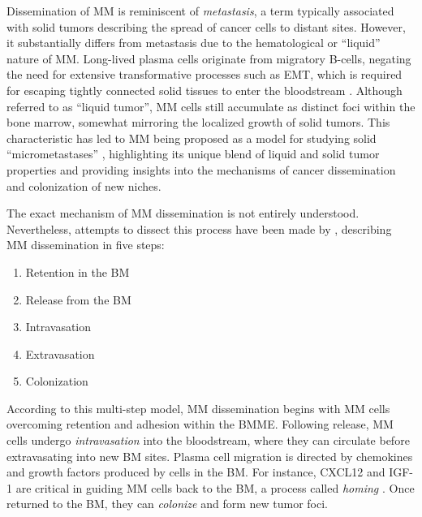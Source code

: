 Dissemination of \ac{MM} is reminiscent of \emph{metastasis}, a term typically
associated with solid tumors describing the spread of cancer cells to distant
sites. However, it substantially differs from metastasis due to the
hematological or ``liquid'' nature of \ac{MM}. Long-lived plasma cells originate
from migratory B-cells, negating the need for extensive transformative processes
such as \ac{EMT}, which is required for escaping tightly connected solid tissues
to enter the bloodstream
\cite{ribattiEpithelialMesenchymalTransitionCancer2020}. Although referred to as
``liquid tumor'', \ac{MM} cells still accumulate as distinct foci within the
bone marrow, somewhat mirroring the localized growth of solid tumors. This
characteristic has led to \ac{MM} being proposed as a model for studying solid
``micrometastases'' \cite{ghobrialMyelomaModelProcess2012}, highlighting its
unique blend of liquid and solid tumor properties and providing insights into
the mechanisms of cancer dissemination and colonization of new niches.

The exact mechanism of \ac{MM} dissemination is not entirely understood.
Nevertheless, attempts to dissect this process have been made by
\citet{zeissigTumourDisseminationMultiple2020}, describing \ac{MM} dissemination
in five steps:
\begin{enumerate}
    \item Retention in the \ac{BM}
    \item Release from the \ac{BM}
    \item Intravasation
    \item Extravasation
    \item Colonization
\end{enumerate}


According to this multi-step model, \ac{MM} dissemination begins with \ac{MM}
cells overcoming retention and adhesion within the \ac{BMME}. Following release,
\ac{MM} cells undergo \emph{intravasation} into the bloodstream, where they can
circulate before extravasating into new \ac{BM} sites. Plasma cell migration is
directed by chemokines and growth factors produced by cells in the \ac{BM}. For
instance, \ac{CXCL12} and \ac{IGF-1} are critical in guiding \ac{MM} cells back
to the \ac{BM}, a process called \emph{homing}
\cite{vandebroekExtravasationHomingMechanisms2008}. Once returned to the
\ac{BM}, they can \emph{colonize} and form new tumor foci.

